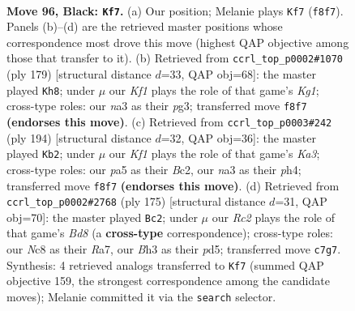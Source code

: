 \documentclass[11pt]{article}
\begin{document}
\clearpage

\begin{figure}[p]\centering
\begin{subfigure}{0.46\textwidth}\centering
\resizebox{\linewidth}{!}{%
\newchessgame
\chessboard[
  setfen={2n2k1K/2r5/p6B/P4p1p/8/N5Pb/8/R7 b - - 3 96},
  showmover=false,
  pgfstyle=straightmove, color=movearrow, markmove={f8-f7}
]}
\caption{}
\end{subfigure}\hfill
\begin{subfigure}{0.46\textwidth}\centering
\resizebox{\linewidth}{!}{%
\newchessgame
\chessboard[
  setfen={6k1/3R4/4Bp2/7p/4P2P/6P1/1r3b2/3K4 b - - 8 90},
  showmover=false,
  pgfstyle=straightmove, color=movearrow, markmove={g8-h8}
]}
\caption{}
\end{subfigure}
\\[4pt]
\begin{subfigure}{0.46\textwidth}\centering
\resizebox{\linewidth}{!}{%
\newchessgame
\chessboard[
  setfen={7k/r2b4/8/2pNP1b1/2P4p/K1P5/2B5/6R1 w - - 5 98},
  showmover=false,
  pgfstyle=straightmove, color=movearrow, markmove={a3-b2}
]}
\caption{}
\end{subfigure}\hfill
\begin{subfigure}{0.46\textwidth}\centering
\resizebox{\linewidth}{!}{%
\newchessgame
\chessboard[
  setfen={8/r7/3p4/3Pp2p/4P2P/8/1R1k1K2/3b1B2 b - - 74 88},
  showmover=false,
  pgfstyle=straightmove, color=movearrow, markmove={d1-c2}
]}
\caption{}
\end{subfigure}
\caption{\textbf{Move 96, Black: \texttt{Kf7}.} (a) Our position; Melanie plays \texttt{Kf7} (\texttt{f8f7}). Panels (b)--(d) are the retrieved master positions whose correspondence most drove this move (highest QAP objective among those that transfer to it). (b) Retrieved from \texttt{ccrl\_top\_p0002\#1070} (ply 179) [structural distance $d$=33, QAP obj=68]: the master played \texttt{Kh8}; under $\mu$ our \emph{Kf1} plays the role of that game's \emph{Kg1}; cross-type roles: our \emph{n}a3 as their \emph{p}g3; transferred move \texttt{f8f7} \textbf{(endorses this move)}. (c) Retrieved from \texttt{ccrl\_top\_p0003\#242} (ply 194) [structural distance $d$=32, QAP obj=36]: the master played \texttt{Kb2}; under $\mu$ our \emph{Kf1} plays the role of that game's \emph{Ka3}; cross-type roles: our \emph{p}a5 as their \emph{B}c2, our \emph{n}a3 as their \emph{p}h4; transferred move \texttt{f8f7} \textbf{(endorses this move)}. (d) Retrieved from \texttt{ccrl\_top\_p0002\#2768} (ply 175) [structural distance $d$=31, QAP obj=70]: the master played \texttt{Bc2}; under $\mu$ our \emph{Rc2} plays the role of that game's \emph{Bd8} (a \textbf{cross-type} correspondence); cross-type roles: our \emph{N}c8 as their \emph{R}a7, our \emph{B}h3 as their \emph{p}d5; transferred move \texttt{c7g7}. Synthesis: 4 retrieved analogs transferred to \texttt{Kf7} (summed QAP objective 159, the strongest correspondence among the candidate moves); Melanie committed it via the \texttt{search} selector.}
\label{fig:thought-m191}
\end{figure}
\end{document}
